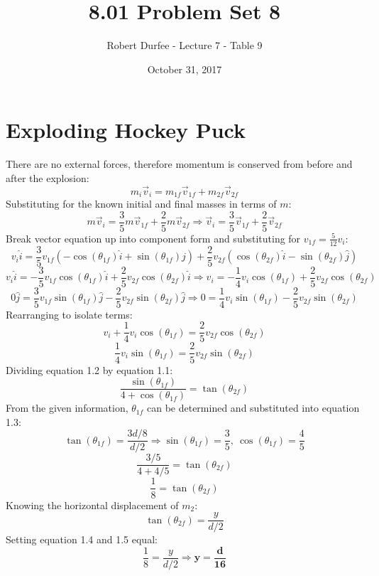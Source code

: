 \documentclass{article}
\title{8.01 Problem Set 8}
\author{Robert Durfee - Lecture 7 - Table 9}
\date{October 31, 2017}
\begin{document}
\maketitle


\section{Exploding Hockey Puck}

There are no external forces, therefore momentum is conserved from before and
after the explosion:
$$m_{i}\vec{v}_{i}=m_{1f}\vec{v}_{1f}+m_{2f}\vec{v}_{2f}$$
Substituting for the known initial and final masses in terms of $m$:
$$m\vec{v}_{i}=\frac{3}{5}m\vec{v}_{1f}+\frac{2}{5}m\vec{v}_{2f}\Rightarrow\vec{v}_{i}=\frac{3}{5}\vec{v}_{1f}+\frac{2}{5}\vec{v}_{2f}$$
Break vector equation up into component form and substituting for
$v_{1f}=\frac{5}{12}v_{i}$:
$$v_{i}\hat{i}=\frac{3}{5}v_{1f}(-\cos(\theta_{1f})\hat{i}+\sin(\theta_{1f})\hat{j})+\frac{2}{5}v_{2f}(\cos(\theta_{2f})\hat{i}-\sin(\theta_{2f})\hat{j})$$
$$v_{i}\hat{i}=-\frac{3}{5}v_{1f}\cos(\theta_{1f})\hat{i}+\frac{2}{5}v_{2f}\cos(\theta_{2f})\hat{i}\Rightarrow
v_{i}=-\frac{1}{4}v_{i}\cos(\theta_{1f})+\frac{2}{5}v_{2f}\cos(\theta_{2f})$$
$$0\hat{j}=\frac{3}{5}v_{1f}\sin(\theta_{1f})\hat{j}-\frac{2}{5}v_{2f}\sin(\theta_{2f})\hat{j}\Rightarrow0=\frac{1}{4}v_{i}\sin(\theta_{1f})-\frac{2}{5}v_{2f}\sin(\theta_{2f})$$
Rearranging to isolate terms:
\begin{equation}
    v_{i}+\frac{1}{4}v_{i}\cos(\theta_{1f})=\frac{2}{5}v_{2f}\cos(\theta_{2f})
\end{equation}
\begin{equation}
    \frac{1}{4}v_{i}\sin(\theta_{1f})=\frac{2}{5}v_{2f}\sin(\theta_{2f})
\end{equation}
Dividing equation 1.2 by equation 1.1:
\begin{equation}
    \frac{\sin(\theta_{1f})}{4+\cos(\theta_{1f})}=\tan(\theta_{2f})
\end{equation}
From the given information, $\theta_{1f}$ can be determined and substituted into
equation 1.3:
$$\tan(\theta_{1f})=\frac{3d/8}{d/2}\Rightarrow\sin(\theta_{1f})=\frac{3}{5},\
\cos(\theta_{1f})=\frac{4}{5}$$
$$\frac{3/5}{4+4/5}=\tan(\theta_{2f})$$
\begin{equation}\frac{1}{8}=\tan(\theta_{2f})\end{equation}
Knowing the horizontal displacement of $m_{2}$:
\begin{equation}
    \tan(\theta_{2f})=\frac{y}{d/2}
\end{equation}
Setting equation 1.4 and 1.5 equal:
$$\frac{1}{8}=\frac{y}{d/2}\Rightarrow\bm{y=\frac{d}{16}}$$
\end{document}
